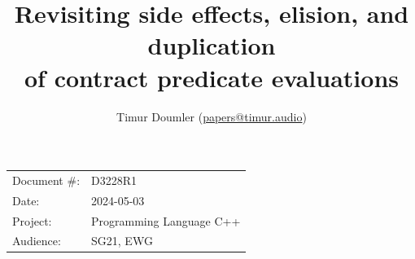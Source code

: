 

 \usepackage[bottom]{footmisc} 

 \usepackage{longtable}


\usepackage{tikz,lipsum,lmodern}
\usepackage[most]{tcolorbox}



\usepackage{titlesec}
\usepackage{tocloft}


\newcommand{\changelocaltocdepth}[1]{%
  \addtocontents{toc}{\protect\setcounter{tocdepth}{#1}}%
  \setcounter{tocdepth}{#1}%
}

\setcounter{tocdepth}{3}



\title{Revisiting side effects, elision, and duplication \\ of contract predicate evaluations}
\author{ Timur Doumler \small(\href{mailto:papers@timur.audio}{papers@timur.audio}) 
}
\date{}
\maketitle

\begin{tabular}{ll}
Document \#: & D3228R1 \\
Date: &2024-05-03 \\
Project: & Programming Language C++ \\
Audience: & SG21, EWG
\end{tabular}


